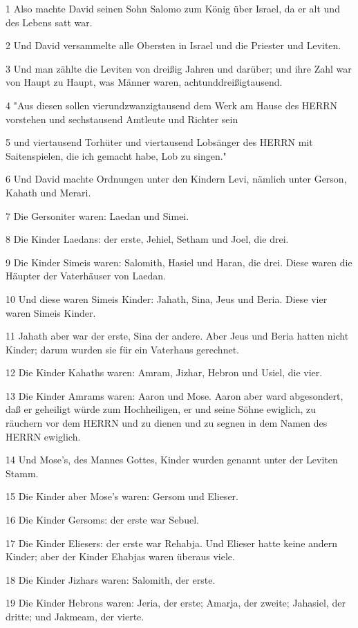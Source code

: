 \par 1 Also machte David seinen Sohn Salomo zum König über Israel, da er alt und des Lebens satt war.
\par 2 Und David versammelte alle Obersten in Israel und die Priester und Leviten.
\par 3 Und man zählte die Leviten von dreißig Jahren und darüber; und ihre Zahl war von Haupt zu Haupt, was Männer waren, achtunddreißigtausend.
\par 4 "Aus diesen sollen vierundzwanzigtausend dem Werk am Hause des HERRN vorstehen und sechstausend Amtleute und Richter sein
\par 5 und viertausend Torhüter und viertausend Lobsänger des HERRN mit Saitenspielen, die ich gemacht habe, Lob zu singen."
\par 6 Und David machte Ordnungen unter den Kindern Levi, nämlich unter Gerson, Kahath und Merari.
\par 7 Die Gersoniter waren: Laedan und Simei.
\par 8 Die Kinder Laedans: der erste, Jehiel, Setham und Joel, die drei.
\par 9 Die Kinder Simeis waren: Salomith, Hasiel und Haran, die drei. Diese waren die Häupter der Vaterhäuser von Laedan.
\par 10 Und diese waren Simeis Kinder: Jahath, Sina, Jeus und Beria. Diese vier waren Simeis Kinder.
\par 11 Jahath aber war der erste, Sina der andere. Aber Jeus und Beria hatten nicht Kinder; darum wurden sie für ein Vaterhaus gerechnet.
\par 12 Die Kinder Kahaths waren: Amram, Jizhar, Hebron und Usiel, die vier.
\par 13 Die Kinder Amrams waren: Aaron und Mose. Aaron aber ward abgesondert, daß er geheiligt würde zum Hochheiligen, er und seine Söhne ewiglich, zu räuchern vor dem HERRN und zu dienen und zu segnen in dem Namen des HERRN ewiglich.
\par 14 Und Mose's, des Mannes Gottes, Kinder wurden genannt unter der Leviten Stamm.
\par 15 Die Kinder aber Mose's waren: Gersom und Elieser.
\par 16 Die Kinder Gersoms: der erste war Sebuel.
\par 17 Die Kinder Eliesers: der erste war Rehabja. Und Elieser hatte keine andern Kinder; aber der Kinder Ehabjas waren überaus viele.
\par 18 Die Kinder Jizhars waren: Salomith, der erste.
\par 19 Die Kinder Hebrons waren: Jeria, der erste; Amarja, der zweite; Jahasiel, der dritte; und Jakmeam, der vierte.
